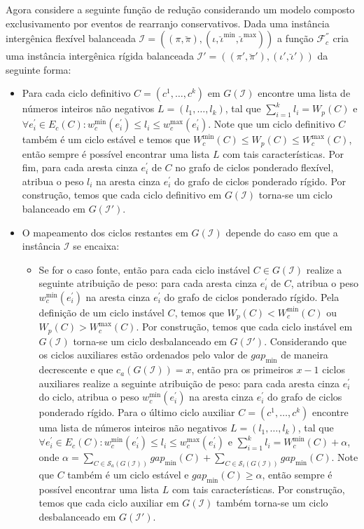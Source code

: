 Agora considere a seguinte função de redução considerando um modelo composto exclusivamento por eventos de rearranjo conservativos. Dada uma instância intergênica flexível balanceada $\mathcal{I} = ((\pi,\breve\pi),(\iota,\breve\iota^{\min},\breve\iota^{\max}))$ a função $\mathcal{F}_{c}^{''}$ cria uma instância intergênica rígida balanceada $\mathcal{I'} = ((\pi',\breve\pi'),(\iota',\breve\iota'))$ da seguinte forma:

\begin{itemize}
  \item Para cada ciclo definitivo $C=(c^1,\dots,c^k)$ em $G(\mathcal{I})$ encontre uma lista de números inteiros não negativos $L=(l_1,\dots,l_k)$, tal que $\sum_{i=1}^{k}l_i = W_p(C)$ e $\forall e^{\prime}_i \in E_c(C): w^{\min}_c(e^{\prime}_i) \le l_i \le w^{\max}_c(e^{\prime}_i)$. Note que um ciclo definitivo $C$ também é um ciclo estável e temos que $W^{\min}_c(C) \le W_p(C) \le W^{\max}_c(C)$, então sempre é possível encontrar uma lista $L$ com tais características. Por fim, para cada aresta cinza $e^{\prime}_i$ de $C$ no grafo de ciclos ponderado flexível, atribua o peso $l_i$ na aresta cinza $e^{\prime}_i$ do grafo de ciclos ponderado rígido. Por construção, temos que cada ciclo definitivo em $G(\mathcal{I})$ torna-se um ciclo balanceado em $G(\mathcal{I}')$.
  \item O mapeamento dos ciclos restantes em $G(\mathcal{I})$ depende do caso em que a instância $\mathcal{I}$ se encaixa: 

  \begin{itemize}
    \item Se for o caso fonte, então para cada ciclo instável $C \in G(\mathcal{I})$ realize a seguinte atribuição de peso: para cada aresta cinza $e^{\prime}_i$ de $C$, atribua o peso $w^{\min}_c(e^{\prime}_i)$ na aresta cinza $e^{\prime}_i$ do grafo de ciclos ponderado rígido. Pela definição de um ciclo instável $C$, temos que $W_p(C)  < W^{\min}_c(C)$ ou $W_p(C) > W^{\max}_c(C)$. Por construção, temos que cada ciclo instável em $G(\mathcal{I})$ torna-se um ciclo desbalanceado em $G(\mathcal{I}')$. Considerando que os ciclos auxiliares estão ordenados pelo valor de $gap_{\min}$ de maneira decrescente e que $c_a(G(\mathcal{I})) = x$, então pra os primeiros $x-1$ ciclos auxiliares realize a seguinte atribuição de peso: para cada aresta cinza $e^{\prime}_i$ do ciclo, atribua o peso $w^{\min}_c(e^{\prime}_i)$ na aresta cinza $e^{\prime}_i$ do grafo de ciclos ponderado rígido. Para o último ciclo auxiliar $C=(c^1,\dots,c^k)$ encontre uma lista de números inteiros não negativos $L=(l_1,\dots,l_k)$, tal que $\forall e^{\prime}_i \in E_c(C): w^{\min}_c(e^{\prime}_i) \le l_i \le w^{\max}_c(e^{\prime}_i)$ e $\sum_{i=1}^{k}l_i = W^{\min}_c(C) + \alpha$, onde $\alpha = \sum_{C \in \mathcal{S}_a(G(\mathcal{I}))} gap_{\min}(C) + \sum_{C \in \mathcal{S}_i(G(\mathcal{I}))} gap_{\min}(C)$. Note que $C$ também é um ciclo estável e $gap_{\min}(C) \ge \alpha$, então sempre é possível encontrar uma lista $L$ com tais características. Por construção, temos que cada ciclo auxiliar em $G(\mathcal{I})$ também torna-se um ciclo desbalanceado em $G(\mathcal{I}')$.


\end{itemize}
\end{itemize}
